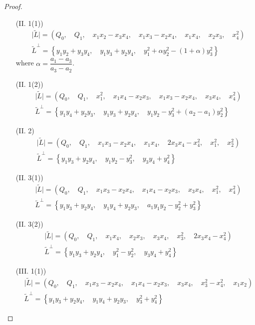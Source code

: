 \documentclass{amsart}[12pt]
\theoremstyle{definition}
\theoremstyle{remark}
\numberwithin{equation}{section}
\newcommand{\abs}[1]{\lvert#1\rvert}
\begin{document}
\begin{proof}
\begin{enumerate}
\item[(II. 1(1))]
\begin{align*}
& \abs{\tilde{L}} = (Q_0, \quad Q_1, \quad x_1x_2 - x_3x_4, \quad x_1x_3 - x_2x_4, \quad x_1x_4, \quad x_2x_3, \quad x_4^2) \\
& \tilde{L}^{\perp} = \left\{ y_1y_2 + y_3y_4, \quad y_1y_3 + y_2y_4,  \quad y_1^2 + \alpha y_2^2 - (1 + \alpha) y_3^2 \right\}
\end{align*} 
where $\alpha = \dfrac{a_1 - a_3}{a_3 - a_2}$.

\item[(II. 1(2))]
\begin{align*}
& \abs{\tilde{L}} = (Q_0, \quad Q_1, \quad x_1^2, \quad x_1x_4 - x_2x_3, \quad x_1x_3 - x_2x_4, \quad x_3x_4, \quad x_4^2) \\
& \tilde{L}^{\perp} = \left\{ y_1y_4 + y_2y_3, \quad y_1y_3 + y_2y_4,  \quad y_1y_2 - y_3^2 + (a_2 - a_1)y_2^2 \right\}
\end{align*} 

\item[(II. 2)]
\begin{align*}
& \abs{\tilde{L}} = (Q_0, \quad Q_1, \quad x_1x_3 - x_2x_4, \quad x_1x_4, \quad 2x_3x_4 - x_4^2, \quad x_1^2, \quad x_2^2) \\
& \tilde{L}^{\perp} = \left\{ y_1y_3 + y_2y_4,   \quad y_1y_2 - y_3^2, \quad y_3y_4 + y_4^2 \right\}
\end{align*}

\item[(II. 3(1))]
\begin{align*}
& \abs{\tilde{L}} = (Q_0, \quad Q_1, \quad x_1x_3 - x_2x_4, \quad x_1x_4 - x_2x_3, \quad x_3x_4, \quad x_1^2, \quad x_4^2) \\
& \tilde{L}^{\perp} = \left\{ y_1y_3 + y_2y_4,   \quad y_1y_4 + y_2y_3, \quad a_1y_1y_2 - y_2^2 + y_3^2 \right\}
\end{align*}

\item[(II. 3(2))]
\begin{align*}
& \abs{\tilde{L}} = (Q_0, \quad Q_1, \quad x_1x_4, \quad x_2x_3, \quad x_3x_4, \quad x_3^2, \quad 2x_3x_4 - x_4^2) \\
& \tilde{L}^{\perp} = \left\{ y_1y_3 + y_2y_4,   \quad y_1^2 - y_2^2, \quad y_3y_4 + y_4^2 \right\}
\end{align*}

\item[(III. 1(1))]
\begin{align*}
& \abs{\tilde{L}} = (Q_0, \quad Q_1, \quad x_1x_3 - x_2x_4, \quad x_1x_4 - x_2x_3, \quad x_3x_4, \quad x_3^2 - x_4^2, \quad x_1x_2) \\
& \tilde{L}^{\perp} = \left\{ y_1y_3 + y_2y_4,   \quad y_1y_4 + y_2y_3, \quad y_3^2 + y_4^2 \right\}
\end{align*}


\end{enumerate}
\end{proof}
\end{document}
